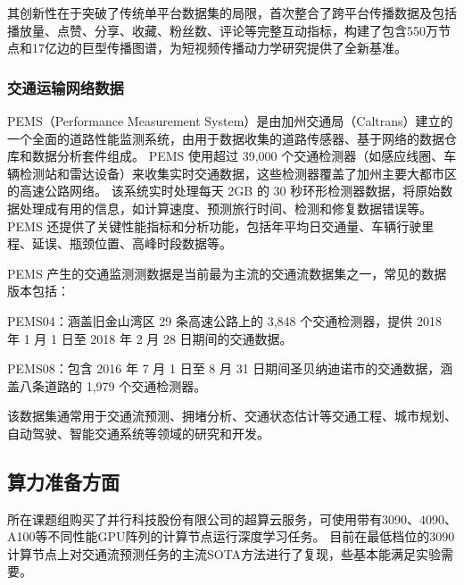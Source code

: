 其创新性在于突破了传统单平台数据集的局限，首次整合了跨平台传播数据及包括播放量、点赞、分享、收藏、粉丝数、评论等完整互动指标，构建了包含550万节点和17亿边的巨型传播图谱，为短视频传播动力学研究提供了全新基准。


\subsubsection{交通运输网络数据}

PEMS（Performance Measurement System）是由加州交通局（Caltrans）建立的一个全面的道路性能监测系统，由用于数据收集的道路传感器、基于网络的数据仓库和数据分析套件组成。
PEMS 使用超过 39,000 个交通检测器（如感应线圈、车辆检测站和雷达设备）来收集实时交通数据，这些检测器覆盖了加州主要大都市区的高速公路网络。
该系统实时处理每天 2GB 的 30 秒环形检测器数据，将原始数据处理成有用的信息，如计算速度、预测旅行时间、检测和修复数据错误等。PEMS 还提供了关键性能指标和分析功能，包括年平均日交通量、车辆行驶里程、延误、瓶颈位置、高峰时段数据等。

PEMS 产生的交通监测测数据是当前最为主流的交通流数据集之一，常见的数据版本包括：

PEMS04：涵盖旧金山湾区 29 条高速公路上的 3,848 个交通检测器，提供 2018 年 1 月 1 日至 2018 年 2 月 28 日期间的交通数据。

PEMS08：包含 2016 年 7 月 1 日至 8 月 31 日期间圣贝纳迪诺市的交通数据，涵盖八条道路的 1,979 个交通检测器。

该数据集通常用于交通流预测、拥堵分析、交通状态估计等交通工程、城市规划、自动驾驶、智能交通系统等领域的研究和开发。


\subsection{算力准备方面}

所在课题组购买了并行科技股份有限公司的超算云服务，可使用带有3090、4090、A100等不同性能GPU阵列的计算节点运行深度学习任务。
目前在最低档位的3090计算节点上对交通流预测任务的主流SOTA方法进行了复现，些基本能满足实验需要。


